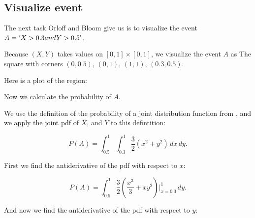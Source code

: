 \documentclass[a4paper,11pt]{article}
\begin{document}
\subsection{Visualize event}
The next task Orloff and Bloom give us is to visualize the
event $A = `X > 0.3 and Y > 0.5'$.

Because $\left( X, Y \right)$ takes values on
$\left[0, 1\right] \times \left[0,1\right]$, we visualize the event $A$ as
The square with corners $\left(0, 0.5 \right)$, $\left(0, 1 \right)$, $\left( 1, 1 \right)$, $\left(0.3, 0.5 \right)$.

Here is a plot of the region:
\begin{center}
\end{center}

Now we calculate the probability of $A$.

We use the definition of the probability of a joint distribution function from
\cite{reading7}, and we apply the joint pdf of $X$, and $Y$ to this
defintition:

\begin{equation}
P \left( A \right) =
  \int_{0.5}^{1} \int_{0.3}^{1} \frac{3}{2}\left(x^2 + y^2 \right) \,dx\,dy.
\end{equation}

First we find the antiderivative of the pdf with respect to $x$:


\begin{equation}
P \left( A \right) =
  \int_{0.5}^{1} \frac{3}{2}\left(\frac{x^3}{3}
    + xy^2 \right) \bigg\rvert_{x=0.3}^{1}\,dy.
\end{equation}

And now we find the antiderivative of the pdf with respect to $y$:
\end{document}
